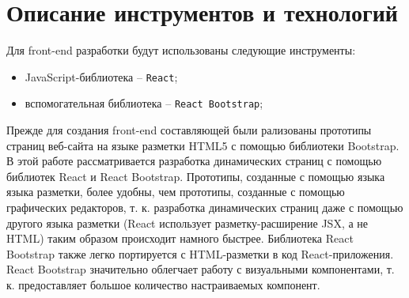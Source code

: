 \documentclass[a4paper,12pt]{article}
\begin{document}
\newpage
\section{Описание инструментов и технологий}

Для front-end разработки будут использованы следующие инструменты:
\begin{itemize}
	\item JavaScript-библиотека -- \texttt{React};
	\item вспомогательная библиотека -- \texttt{React Bootstrap};
\end{itemize}

Прежде для создания front-end составляющей были рализованы прототипы страниц веб-сайта на языке разметки HTML5 с помощью библиотеки Bootstrap. В этой работе рассматривается разработка динамических страниц с помощью библиотек React и React Bootstrap. Прототипы, созданные с помощью языка языка разметки, более удобны, чем прототипы, созданные с помощью графических редакторов, т. к. разработка динамических страниц даже с помощью другого языка разметки (React использует разметку-расширение JSX, а не HTML) таким образом происходит намного быстрее. Библиотека React Bootstrap также легко портируется с HTML-разметки в код React-приложения. React Bootstrap значительно облегчает работу с визуальными компонентами, т. к. предоставляет большое количество настраиваемых компонент.\\
 
\end{document}
